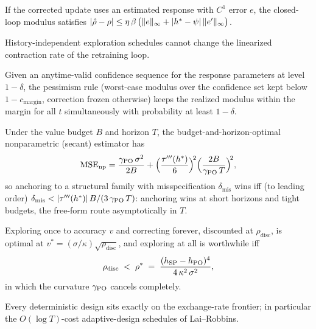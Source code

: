 \documentclass[11pt]{article}
\begin{document}
\begin{lemma}
If the corrected update uses an estimated response with $C^1$ error $e$,
the closed-loop modulus satisfies
$|\hat\rho - \rho| \le \eta\,\beta\,\big(\|e\|_\infty +
|h^{*}-\psi|\,\|e'\|_\infty\big)$.
\end{lemma}

\begin{remark}
History-independent exploration schedules cannot change the linearized
contraction rate of the retraining loop.
\end{remark}

\begin{proposition}
Given an anytime-valid confidence sequence for the response parameters at
level $1-\delta$, the pessimism rule (worst-case modulus over the
confidence set kept below $1 - c_{\mathrm{margin}}$, correction frozen
otherwise) keeps the realized modulus within the margin for all $t$
simultaneously with probability at least $1-\delta$.
\end{proposition}

\begin{theorem}
Under the value budget $B$ and horizon $T$, the budget-and-horizon-optimal
nonparametric (secant) estimator has
\[
\mathrm{MSE}_{\mathrm{np}} = \frac{\gamma_{\mathrm{PO}}\,\sigma^2}{2B}
+ \Big(\frac{\tau'''(h^{*})}{6}\Big)^{\!2}
\Big(\frac{2B}{\gamma_{\mathrm{PO}}\,T}\Big)^{\!2},
\]
so anchoring to a structural family with misspecification
$\delta_{\mathrm{mis}}$ wins iff (to leading order)
$\delta_{\mathrm{mis}} < |\tau'''(h^{*})|\,B/(3\,\gamma_{\mathrm{PO}}\,T)$: anchoring wins
at short horizons and tight budgets, the free-form route asymptotically in
$T$.
\end{theorem}

\begin{theorem}
Exploring once to accuracy $v$ and correcting forever, discounted at
$\rho_{\mathrm{disc}}$, is optimal at
$v^{*} = (\sigma/\kappa)\sqrt{\rho_{\mathrm{disc}}}$, and exploring at all
is worthwhile iff
\[
\rho_{\mathrm{disc}} \;<\; \rho^{*} \;=\;
\frac{(h_{\mathrm{SP}} - h_{\mathrm{PO}})^4}{4\,\kappa^2\,\sigma^2},
\]
in which the curvature $\gamma_{\mathrm{PO}}$ cancels completely.
\end{theorem}

\begin{proposition}
Every deterministic design sits exactly on the exchange-rate frontier; in
particular the $O(\log T)$-cost adaptive-design schedules of Lai--Robbins.
\end{proposition}
\end{document}
